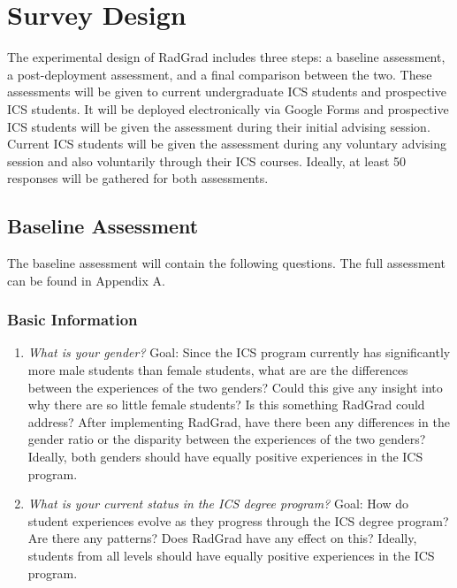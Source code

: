 \chapter{Survey Design}
\label{surveyDesign}
The experimental design of RadGrad includes three steps: a baseline assessment, a post-deployment assessment, and a final comparison between the two. These assessments will be given to current undergraduate ICS students and prospective ICS students. It will be deployed electronically via Google Forms and prospective ICS students will be given the assessment during their initial advising session. Current ICS students will be given the assessment during any voluntary advising session and also voluntarily through their ICS courses. Ideally, at least 50 responses will be gathered for both assessments.
\section{Baseline Assessment}
\label{baselineAssessment}
	The baseline assessment will contain the following questions. The full assessment can be found in Appendix A. 

\subsection{Basic Information}
\begin{enumerate}
\item \textit{What is your gender? }
Goal: Since the ICS program currently has significantly more male students than female students, what are are the differences between the experiences of the two genders? Could this give any insight into why there are so little female students? Is this something RadGrad could address? After implementing RadGrad, have there been any differences in the gender ratio or the disparity between the experiences of the two genders? Ideally, both genders should have equally positive experiences in the ICS program.
\item \textit{What is your current status in the ICS degree program?}
Goal: How do student experiences evolve as they progress through the ICS degree program? Are there any patterns? Does RadGrad have any effect on this? Ideally, students from all levels should have equally positive experiences in the ICS program. 
\end{enumerate}

